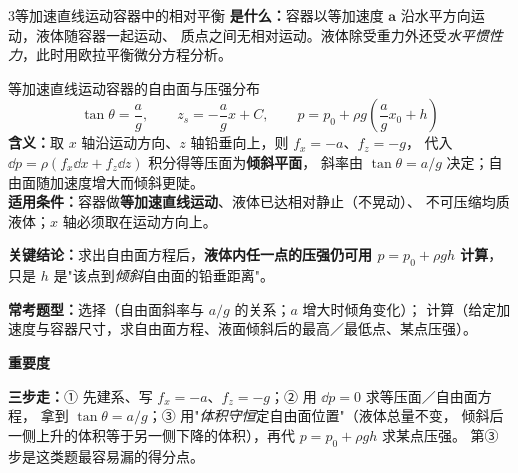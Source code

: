 \begin{kaodian}{3}{等加速直线运动容器中的相对平衡}
\textbf{是什么：}容器以等加速度 $\bm{a}$ 沿水平方向运动，液体随容器一起运动、
质点之间无相对运动。液体除受重力外还受\emph{水平惯性力}，此时用欧拉平衡微分方程分析。

\begin{gongshi}{等加速直线运动容器的自由面与压强分布}
\[
\tan\theta=\frac{a}{g},\qquad z_s=-\frac{a}{g}x+C,\qquad
p=p_0+\rho g\left(\frac{a}{g}x_0+h\right)
\]
\textbf{含义：}取 $x$ 轴沿运动方向、$z$ 轴铅垂向上，则 $f_x=-a$、$f_z=-g$，
代入 $\dd p=\rho(f_x\dd x+f_z\dd z)$ 积分得等压面为\textbf{倾斜平面}，
斜率由 $\tan\theta=a/g$ 决定；自由面随加速度增大而倾斜更陡。\\
\textbf{适用条件：}容器做\textbf{等加速直线运动}、液体已达相对静止（不晃动）、
不可压缩均质液体；$x$ 轴必须取在运动方向上。
\end{gongshi}

\textbf{关键结论：}求出自由面方程后，\textbf{液体内任一点的压强仍可用 $p=p_0+\rho g h$
计算}，只是 $h$ 是"该点到\emph{倾斜}自由面的铅垂距离"。

\textbf{常考题型：}选择（自由面斜率与 $a/g$ 的关系；$a$ 增大时倾角变化）；
计算（给定加速度与容器尺寸，求自由面方程、液面倾斜后的最高／最低点、某点压强）。

\textbf{重要度 }\quad{}\quad{}

\begin{banfa}
\textbf{三步走：}① 先建系、写 $f_x=-a$、$f_z=-g$；② 用 $\dd p=0$ 求等压面／自由面方程，
拿到 $\tan\theta=a/g$；③ 用"\emph{体积守恒}定自由面位置"（液体总量不变，
倾斜后一侧上升的体积等于另一侧下降的体积），再代 $p=p_0+\rho g h$ 求某点压强。
第③步是这类题最容易漏的得分点。
\end{banfa}
\end{kaodian}

